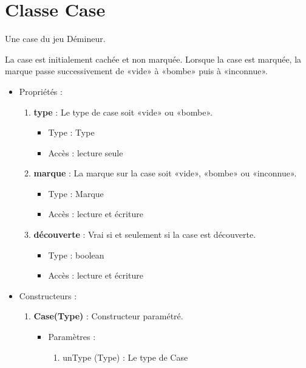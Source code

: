   \section {Classe Case}

  Une case du jeu Démineur.

  La case est initialement cachée et non marquée. Lorsque la case est marquée, la marque passe successivement de «vide» à «bombe» puis à «inconnue».

  \begin{itemize}
  \item Propriétés : 
    \begin{enumerate}
    \item {\bf type }: Le type de case soit «vide» ou «bombe».
          \begin{itemize}
          \item Type : Type
          \item Accès : lecture seule
          \end{itemize}
    \item {\bf marque }: La marque sur la case soit «vide», «bombe» ou «inconnue».
          \begin{itemize}
          \item Type : Marque
          \item Accès : lecture et écriture
          \end{itemize}
    \item {\bf découverte }: Vrai si et seulement si la case est découverte.
          \begin{itemize}
          \item Type : boolean
          \item Accès : lecture et écriture
          \end{itemize}

    \end{enumerate}

  \item Constructeurs : 

  \begin{enumerate}
  \item {\bf Case(Type) }: Constructeur paramétré.
    \begin{itemize}
    \item Paramètres : 
      \begin{enumerate}
      \item unType (Type) : Le type de Case
      \end{enumerate}
    \end{itemize}


\end{enumerate}
\end{itemize}
